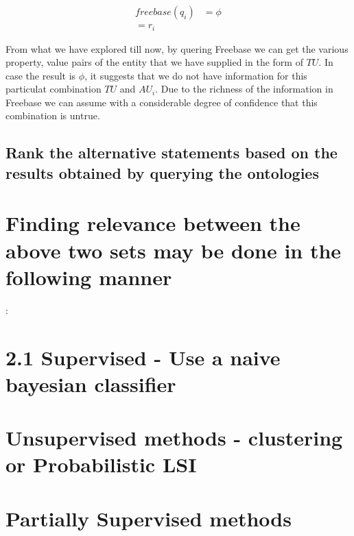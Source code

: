 \documentclass[11pt]{article}
\begin{document}
\begin{align*}
   freebase(q_{i}) &= \phi \\
    = r_{i}
\end{align*}

From what we have explored till now, by quering Freebase we can get the
various property, value pairs of the entity that we have supplied in the form
of $TU$. In case the result is $\phi$, it suggests that we do not have
information for this particulat combination $TU$ and $AU_{i}$. Due to the
richness of the information in Freebase we can assume with a considerable degree of confidence
that this combination is untrue.



 \subsection {Rank the alternative statements based on the results
obtained by querying the ontologies}



\section{Finding relevance between the above two sets may be done in the
following manner}: 

\section{2.1 Supervised - Use a naive bayesian classifier}
\section{Unsupervised methods - clustering or Probabilistic LSI}
\section{Partially Supervised methods}



%
%
\end{document}
